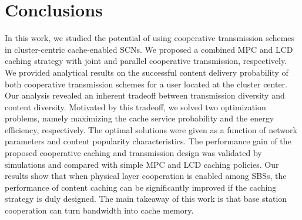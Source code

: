 \documentclass[twocolumns,10pt]{IEEEtran}
\begin{document}
\section{Conclusions}
\label{conclusion}
In this work, we studied the potential of using cooperative transmission schemes in cluster-centric cache-enabled SCNs. We proposed a combined MPC and LCD caching strategy with joint and parallel cooperative transmission, respectively. We provided analytical results on the successful content delivery probability of both cooperative transmission schemes for a user located at the cluster center. Our analysis revealed an inherent tradeoff between transmission diversity and content diversity. Motivated by this tradeoff, we solved two optimization problems, namely maximizing the cache service probability and the energy efficiency, respectively. The optimal solutions were given as a function of network parameters and content popularity characteristics. The performance gain of the proposed cooperative caching and transmission design was validated by simulations and compared with simple MPC and LCD caching policies. Our results show that when physical layer cooperation is enabled among SBSs, the performance of content caching can be significantly improved if the caching strategy is duly designed. The main takeaway of this work is that base station cooperation can turn bandwidth into cache memory. 

 
 
\appendix
\appendices
\end{document}
